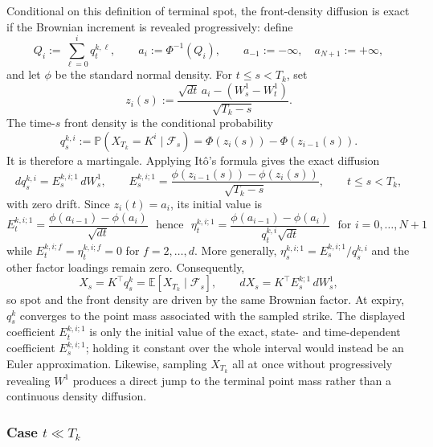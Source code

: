 \documentclass[11pt]{article}
\theoremstyle{plain}
\theoremstyle{definition}
\theoremstyle{remark}
\begin{document}
  Conditional on this definition of terminal spot, the front-density
  diffusion is exact if the Brownian increment is revealed progressively:
  define
  \[
    Q_i:=\sum_{\ell=0}^i q_t^{k,\ell},
    \qquad
    a_i:=\Phi^{-1}(Q_i),
    \qquad
    a_{-1}:=-\infty,\quad a_{N+1}:=+\infty,
  \]
  and let $\phi$ be the standard normal density. For $t\leq s<T_k$, set
  \[
    z_i(s):=
      \frac{\sqrt{dt}\,a_i-(W_s^1-W_t^1)}{\sqrt{T_k-s}}.
  \]
  The time-$s$ front density is the conditional probability
  \begin{equation}
    q_s^{k,i}
      :=\mathbb P\!\left(X_{T_k}=K^i\mid\mathcal F_s\right)
      =\Phi\!\left(z_i(s)\right)
       -\Phi\!\left(z_{i-1}(s)\right).
  \end{equation}
  It is therefore a martingale. Applying It\^o's formula gives the exact
  diffusion
  \begin{equation}
    dq_s^{k,i}=E_s^{k,i;1}\,dW_s^1,
    \qquad
    E_s^{k,i;1}
      =\frac{\phi(z_{i-1}(s))-\phi(z_i(s))}{\sqrt{T_k-s}},
    \qquad t\leq s<T_k,
  \end{equation}
  with zero drift. Since $z_i(t)=a_i$, its initial value is
  \begin{equation}
    E_t^{k,i;1}
      =\frac{\phi(a_{i-1})-\phi(a_i)}{\sqrt{dt}} \ \ \ \mbox{hence} \ \ \
    \eta_t^{k,i;1}
      =\frac{\phi(a_{i-1})-\phi(a_i)}{q_t^{k,i}\sqrt{dt}}
      \ \ \ \mbox{for $i=0,\ldots,N+1$}
  \end{equation}
  while $E_t^{k,i;f}=\eta_t^{k,i;f}=0$ for $f=2,\ldots,d$.
  More generally, $\eta_s^{k,i;1}=E_s^{k,i;1}/q_s^{k,i}$ and the other
  factor loadings remain zero. Consequently,
  \[
    X_s=K^\top q_s^k
      =\mathbb E\!\left[X_{T_k}\mid\mathcal F_s\right],
    \qquad
    dX_s=K^\top E_s^{k;1}\,dW_s^1,
  \]
  so spot and the front density are driven by the same Brownian factor. At
  expiry, $q_s^k$ converges to the point mass associated with the sampled
  strike. The displayed coefficient $E_t^{k,i;1}$ is only the initial value
  of the exact, state- and time-dependent coefficient $E_s^{k,i;1}$; holding
  it constant over the whole interval would instead be an Euler
  approximation. Likewise, sampling $X_{T_k}$ all at once without
  progressively revealing $W^1$ produces a direct jump to the terminal point
  mass rather than a continuous density diffusion.






  \subsubsection*{Case $t\ll T_k$}
\end{document}
